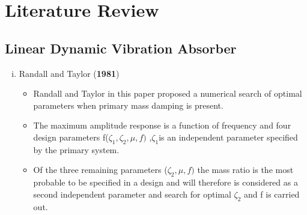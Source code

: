 %
\chapter{Literature Review}
\section{Linear Dynamic Vibration Absorber}
\begin{enumerate}[i)]
\item {Randall and Taylor (\textbf{1981})}
\begin{itemize}
\item Randall and Taylor in this paper proposed a numerical search of optimal parameters when primary mass damping  is present.

\item The maximum amplitude response is a function of frequency and four design parameters f($\zeta_1, \zeta_2,\mu,f)$ ,$\zeta_1 $is an independent parameter specified by the primary system. 

\item Of the three remaining parameters ($\zeta_2,\mu,f)$ the mass ratio is the most probable to be specified in a design and will therefore is considered as a second independent parameter and search for optimal $\zeta_2 $ and f is carried out.


\end{itemize}
\end{enumerate}
